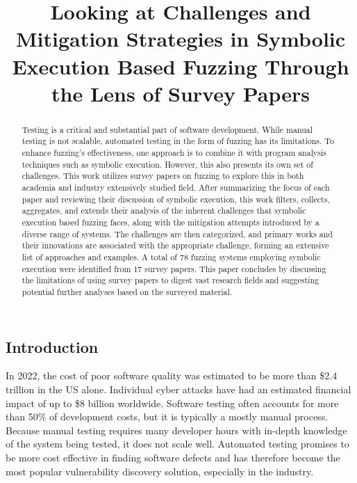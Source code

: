 \documentclass{article}
\title{Looking at Challenges and Mitigation Strategies in Symbolic Execution Based Fuzzing Through the Lens of Survey Papers}
\begin{document}


\maketitle
\begin{multicols}{2}
    \begin{abstract}
        Testing is a critical and substantial part of software development. While manual testing is not scalable, automated testing in the form of fuzzing has its limitations. To enhance fuzzing's effectiveness, one approach is to combine it with program analysis techniques such as symbolic execution. However, this also presents its own set of challenges. This work utilizes survey papers on fuzzing to explore this in both academia and industry extensively studied field. %
        After summarizing the focus of each paper and reviewing their discussion of symbolic execution, this work filters, collects, aggregates, and extends their analysis of the inherent challenges that symbolic execution based fuzzing faces, along with the mitigation attempts introduced by a diverse range of systems. The challenges are then categorized, and primary works and their innovations are associated with the appropriate challenge, forming an extensive list of approaches and examples. A total of 78 fuzzing systems employing symbolic execution were identified from 17 survey papers. %
        This paper concludes by discussing the limitations of using survey papers to digest vast research fields and suggesting potential further analyses based on the surveyed material.
    \end{abstract}

    \section{Introduction}
    In 2022, the cost of poor software quality was estimated to be more than \$2.4 trillion in the US alone.\cite{CostPoorSoftware} Individual cyber attacks have had an estimated financial impact of up to \$8 billion worldwide.\cite{Demystifying} Software testing often accounts for more than 50\% of development costs\cite{Orchestrated}, but it is typically a mostly manual process\cite{PreliminaryAssessment}. Because manual testing requires many developer hours with in-depth knowledge of the system being tested, it does not scale well. Automated testing promises to be more cost effective in finding software defects and has therefore become the most popular vulnerability discovery solution, especially in the industry.\cite{FuzzingASurvey}


\end{multicols}
\end{document}
